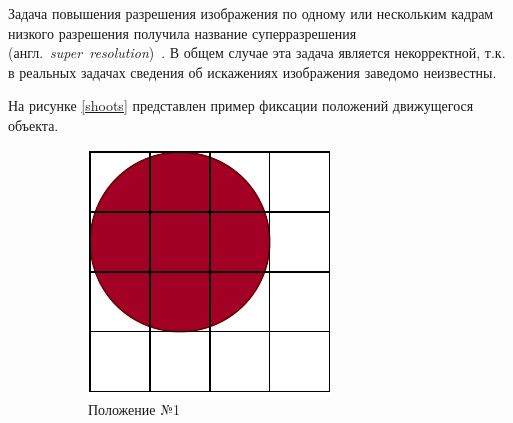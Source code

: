 Задача повышения разрешения изображения по одному или нескольким кадрам низкого разрешения получила название суперразрешения (англ.~\textit{super~resolution})~\cite{n1, n2, n3}. В общем случае эта задача является некорректной, т.к. в реальных задачах сведения об искажениях изображения заведомо неизвестны.

На рисунке \ref{shoots} представлен пример фиксации положений движущегося объекта.
 
\begin{figure}[h!]
    \centering
    \begin{subfigure}{0.17\textwidth}
        \centering
        \includegraphics[width=\textwidth]{assets/c1.pdf}
        \caption{Положение №1}
    \end{subfigure}
    \begin{subfigure}{0.17\textwidth}
        \centering

\end{subfigure}
\end{figure}
